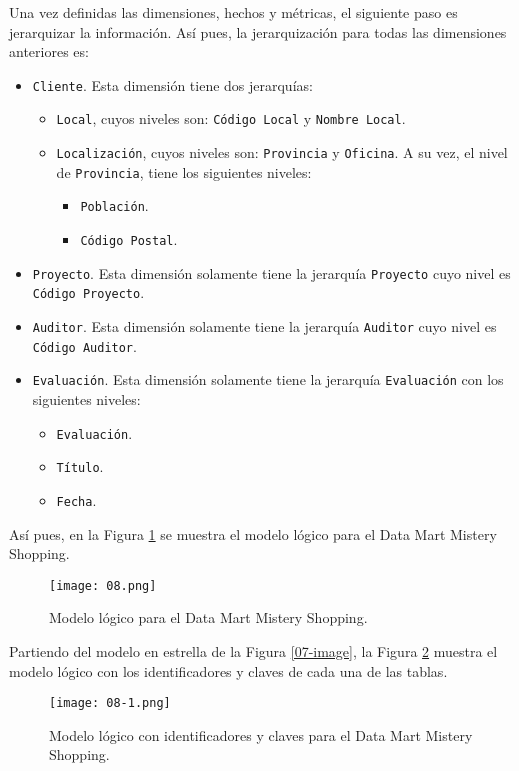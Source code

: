 Una vez definidas las dimensiones, hechos y métricas, el siguiente paso es jerarquizar la información. Así pues, la jerarquización para todas las dimensiones anteriores es:
\begin{itemize}
 \item \texttt{Cliente}. Esta dimensión tiene dos jerarquías:
 \begin{itemize}
  \item \texttt{Local}, cuyos niveles son: \texttt{Código Local} y \texttt{Nombre Local}.
  \item \texttt{Localización}, cuyos niveles son: \texttt{Provincia} y \texttt{Oficina}. A su vez, el nivel de \texttt{Provincia}, tiene los siguientes niveles:
  \begin{itemize}
   \item \texttt{Población}.
   \item \texttt{Código Postal}.
  \end{itemize}

 \end{itemize}

 \item \texttt{Proyecto}. Esta dimensión solamente tiene la jerarquía \texttt{Proyecto} cuyo nivel es \texttt{Código Proyecto}.
 \item \texttt{Auditor}. Esta dimensión solamente tiene la jerarquía \texttt{Auditor} cuyo nivel es \texttt{Código Auditor}.
 \item \texttt{Evaluación}. Esta dimensión solamente tiene la jerarquía \texttt{Evaluación} con los siguientes niveles:
\begin{itemize}
 \item \texttt{Evaluación}.
 \item \texttt{Título}.
 \item \texttt{Fecha}.
\end{itemize}
\end{itemize}

Así pues, en la Figura \ref{08-image} se muestra el modelo lógico para el Data Mart Mistery Shopping.

\begin{figure}[!th]
\texttt{[image: 08.png]}
\centering
\caption{Modelo lógico para el Data Mart Mistery Shopping.}
\label{08-image}
\end{figure}

Partiendo del modelo en estrella de la Figura \ref{07-image}, la Figura \ref{08-1-image} muestra el modelo lógico con los identificadores y claves de cada una de las tablas.

\begin{figure}[!th]
\texttt{[image: 08-1.png]}
\centering
\caption{Modelo lógico con identificadores y claves para el Data Mart Mistery Shopping.}
\label{08-1-image}
\end{figure}
